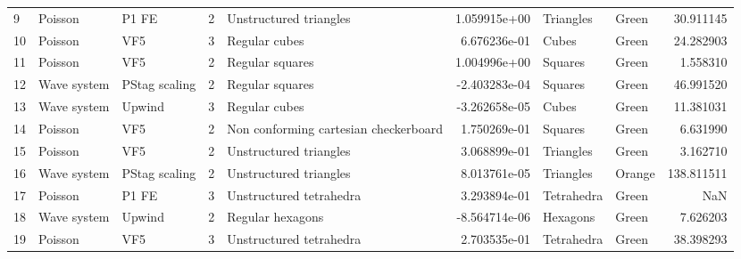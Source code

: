 \begin{tabular}{lllrlrllr}
9  &           Poisson &                 P1 FE &               2 &                    Unstructured triangles &  1.059915e+00 &             Triangles &                                Green &           30.911145 \\
10 &           Poisson &                   VF5 &               3 &                             Regular cubes &  6.676236e-01 &                 Cubes &                                Green &           24.282903 \\
11 &           Poisson &                   VF5 &               2 &                           Regular squares &  1.004996e+00 &               Squares &                                Green &            1.558310 \\
12 &       Wave system &         PStag scaling &               2 &                           Regular squares & -2.403283e-04 &               Squares &                                Green &           46.991520 \\
13 &       Wave system &                Upwind &               3 &                             Regular cubes & -3.262658e-05 &                 Cubes &                                Green &           11.381031 \\
14 &           Poisson &                   VF5 &               2 &     Non conforming cartesian checkerboard &  1.750269e-01 &               Squares &                                Green &            6.631990 \\
15 &           Poisson &                   VF5 &               2 &                    Unstructured triangles &  3.068899e-01 &             Triangles &                                Green &            3.162710 \\
16 &       Wave system &         PStag scaling &               2 &                    Unstructured triangles &  8.013761e-05 &             Triangles &                               Orange &          138.811511 \\
17 &           Poisson &                 P1 FE &               3 &                   Unstructured tetrahedra &  3.293894e-01 &            Tetrahedra &                                Green &                 NaN \\
18 &       Wave system &                Upwind &               2 &                          Regular hexagons & -8.564714e-06 &              Hexagons &                                Green &            7.626203 \\
19 &           Poisson &                   VF5 &               3 &                   Unstructured tetrahedra &  2.703535e-01 &            Tetrahedra &                                Green &           38.398293 \\

\end{tabular}
